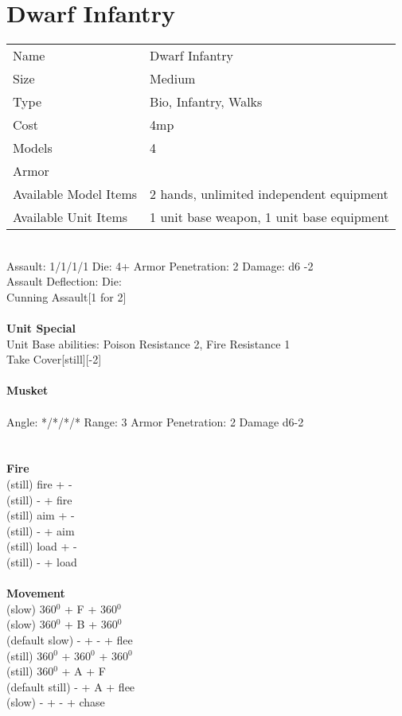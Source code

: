 \pagebreak

\section{ Dwarf Infantry }

\begin{tabular}{ll}
  Name & Dwarf Infantry \\
  Size & Medium\\
  Type & Bio, Infantry, Walks\\
  Cost & 4mp\\
  Models & 4\\
  Armor & \\
  Available Model Items & 2 hands, unlimited independent equipment \\
  Available Unit Items & 1 unit base weapon, 1 unit base equipment \\
\end{tabular}

\ \\
Assault: 1/1/1/1 Die: 4+ Armor Penetration: 2 Damage: d6 -2 \\
Assault Deflection:  Die: \\
\indent Cunning Assault[1 for 2] \\
\ \\

{\bf Unit Special} \\
Unit Base abilities: Poison Resistance 2, Fire Resistance 1\\ Take Cover[still][-2]
\ \\
\ \\
{\bf Musket } \\
\ \\
Angle: */*/*/* Range: 3 Armor Penetration: 2 Damage d6-2 \\
\indent  \\





\ \\ {\bf Fire } \\
(still) fire + - \\
(still) - + fire \\
(still) aim + - \\
(still) - + aim \\
(still) load + - \\
(still) - + load \\
\ \\ {\bf Movement } \\
(slow) 360$^0$ + F + 360$^0$ \\
(slow) 360$^0$ + B + 360$^0$ \\
(default slow) - + - + flee \\
(still) 360$^0$ + 360$^0$ + 360$^0$ \\
(still) 360$^0$ + A + F \\
(default still) - + A + flee \\
(slow) - + - + chase \\



